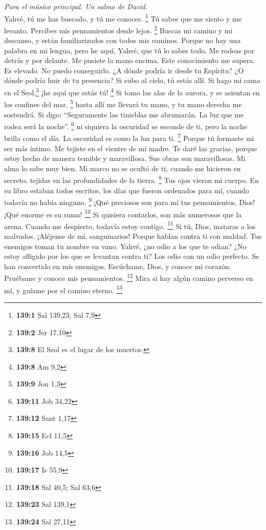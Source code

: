 \begin{paracol}{2}
\emph{Para el músico principal. Un salmo de David.}\\
 Yahvé, tú me has buscado, y tú me conoces. \footnote{\textbf{139:1}
  Sal 139,23; Sal 7,9}  Tú sabes que me siento y me
levanto. Percibes mis pensamientos desde lejos. \footnote{\textbf{139:2}
  Jer 17,10}  Buscas mi camino y mi descanso, y están
familiarizados con todos mis caminos.  Porque no hay una
palabra en mi lengua, pero he aquí, Yahvé, que tú lo sabes todo.
 Me rodeas por detrás y por delante. Me pusiste la mano
encima.  Este conocimiento me supera. Es elevado. No puedo
conseguirlo.  ¿A dónde podría ir desde tu Espíritu? ¿O
dónde podría huir de tu presencia?  Si subo al cielo, tú
estás allí. Si hago mi cama en el Seol,\footnote{\textbf{139:8} El Seol
  es el lugar de los muertos.} ¡he aquí que estás tú! \footnote{\textbf{139:8}
  Am 9,2}  Si tomo las alas de la aurora, y se asientan en
los confines del mar, \footnote{\textbf{139:9} Jon 1,3} 
hasta allí me llevará tu mano, y tu mano derecha me sostendrá.
 Si digo: ``Seguramente las tinieblas me abrumarán. La
luz que me rodea será la noche''. \footnote{\textbf{139:11} Job 34,22}
 ni siquiera la oscuridad se esconde de ti, pero la noche
brilla como el día. La oscuridad es como la luz para ti. \footnote{\textbf{139:12}
  Sant 1,17}  Porque tú formaste mi ser más íntimo. Me
tejiste en el vientre de mi madre.  Te daré las gracias,
porque estoy hecho de manera temible y maravillosa. Sus obras son
maravillosas. Mi alma lo sabe muy bien.  Mi marco no se
ocultó de ti, cuando me hicieron en secreto, tejidas en las
profundidades de la tierra. \footnote{\textbf{139:15} Ecl 11,5}
 Tus ojos vieron mi cuerpo. En su libro estaban todos
escritos, los días que fueron ordenados para mí, cuando todavía no había
ninguno. \footnote{\textbf{139:16} Job 14,5}  ¡Qué
preciosos son para mí tus pensamientos, Dios! ¡Qué enorme es su suma!
\footnote{\textbf{139:17} Is 55,9}  Si quisiera
contarlos, son más numerosos que la arena. Cuando me despierto, todavía
estoy contigo. \footnote{\textbf{139:18} Sal 40,5; Sal 63,6}
 Si tú, Dios, mataras a los malvados. ¡Aléjense de mí,
sanguinarios!  Porque hablan contra ti con maldad. Tus
enemigos toman tu nombre en vano.  Yahvé, ¿no odio a los
que te odian? ¿No estoy afligido por los que se levantan contra ti?
 Los odio con un odio perfecto. Se han convertido en mis
enemigos.  Escúchame, Dios, y conoce mi corazón. Pruébame
y conoce mis pensamientos. \footnote{\textbf{139:23} Sal 139,1}
 Mira si hay algún camino perverso en mí, y guíame por el
camino eterno. \footnote{\textbf{139:24} Sal 27,11}


\end{paracol}
